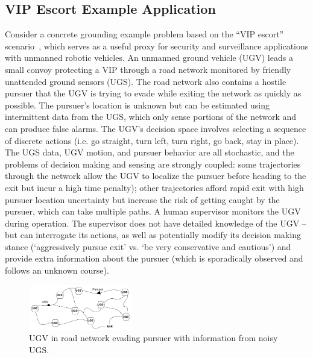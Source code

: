\subsection{VIP Escort Example Application} \label{sec:vip_escort}
Consider a concrete grounding example problem based on the ``VIP escort'' scenario~\cite{Humphrey2012-lr}, which %
serves as a useful proxy for security and surveillance applications with unmanned robotic vehicles. An unmanned ground vehicle (UGV) leads a small convoy protecting a VIP through a road network monitored by friendly unattended ground sensors (UGS). The road network also contains a hostile pursuer that the UGV is trying to evade while exiting the network as quickly as possible. The pursuer's location is unknown but can be estimated using intermittent data from the UGS, which only sense portions of the network and can produce false alarms. The UGV's decision space involves selecting a sequence of discrete actions (i.e. go straight, turn left, turn right, go back, stay in place). The UGS data, UGV motion, and pursuer behavior are all stochastic, and the problems of decision making and sensing are strongly coupled: some trajectories through the network allow the UGV to localize the pursuer before heading to the exit but incur a high time penalty); other trajectories afford rapid exit with high pursuer location uncertainty but increase the risk of getting caught by the pursuer, which can take multiple paths. A human supervisor monitors the UGV during operation. The supervisor does not have detailed knowledge of the UGV -- but can interrogate its actions, as well as potentially modify its decision making stance (`aggressively pursue exit' vs. `be very conservative and cautious') and provide extra information about the pursuer (which is sporadically observed and follows an unknown course). 
    
	\begin{figure}[t]%
    	\centering
     	\includegraphics[width=0.4\textwidth]{Figures/RoadNet}
    	\caption{UGV in road network evading pursuer with information from noisy UGS.} 
        \label{fig:RoadNet}
    \end{figure}

